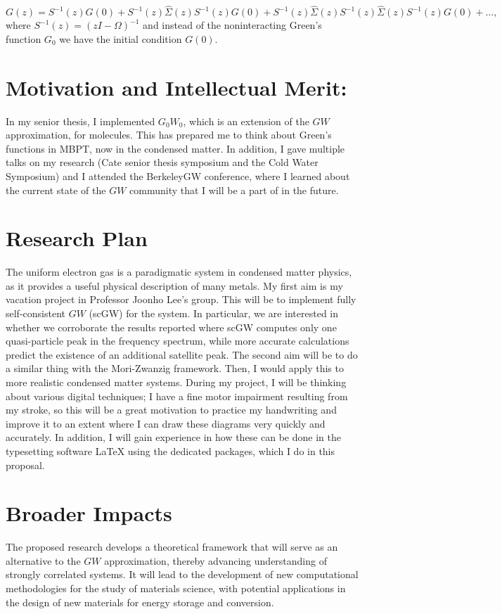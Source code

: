 \documentclass[12pt]{article}
\begin{document}
\begin{equation}
   G(z)=S^{-1}(z) G(0)+S^{-1}(z) \hat{\Sigma}(z) S^{-1}(z) G(0)+S^{-1}(z) \hat{\Sigma}(z) S^{-1}(z) \hat{\Sigma}(z) S^{-1}(z) G(0)+\ldots,
\end{equation}
where \( S^{-1}(z)=(z I-\Omega)^{-1} \) and instead of the noninteracting Green's function \( G_0 \) we have the initial condition \( G(0) \).

\section*{Motivation and Intellectual Merit:}
In my senior thesis, I implemented $G_0W_0$, which is an extension of the $GW$ approximation, for molecules. This has prepared me to think about Green's functions in MBPT, now in the condensed matter. In addition, I gave multiple talks on my research (Cate senior thesis symposium and the Cold Water Symposium) and I attended the BerkeleyGW conference, where I learned about the current state of the $GW$ community that I will be a part of in the future.

\section*{Research Plan}
The uniform electron gas is a paradigmatic system in condensed matter physics, as it provides a useful physical description of many metals. My first aim is my vacation project in Professor Joonho Lee's group. This will be to implement fully self-consistent $GW$ (scGW) for the system. In particular, we are interested in whether we corroborate the results reported where scGW computes only one quasi-particle peak in the frequency spectrum, while more accurate calculations predict the existence of an additional satellite peak. The second aim will be to do a similar thing with the Mori-Zwanzig framework. Then, I would apply this to more realistic condensed matter systems. During my project, I will be thinking about various digital techniques; I have a fine motor impairment resulting from my stroke, so this will be a great motivation to practice my handwriting and improve it to an extent where I can draw these diagrams very quickly and accurately. In addition, I will gain experience in how these can be done in the typesetting software LaTeX using the dedicated packages, which I do in this proposal.

\section*{Broader Impacts}
The proposed research develops a theoretical framework that will serve as an alternative to the $GW$ approximation, thereby advancing understanding of strongly correlated systems. It will lead to the development of new computational methodologies for the study of materials science, with potential applications in the design of new materials for energy storage and conversion. 
\end{document}

